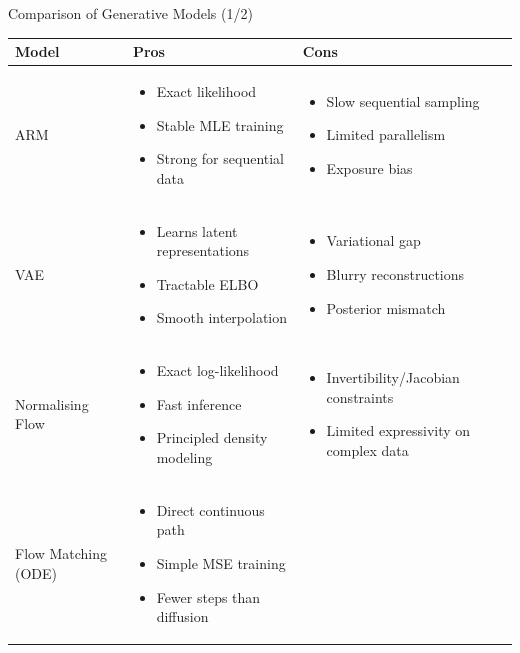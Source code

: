 \documentclass[xcolor=dvipsnames,aspectratio=169]{beamer}
\begin{document}
        \begin{frame}{Comparison of Generative Models (1/2)}
            \tiny
            \renewcommand{\arraystretch}{1.3}
            \begin{tabularx}{\linewidth}{@{} l X X @{}}
                \toprule
                \textbf{Model} & \textbf{Pros} & \textbf{Cons} \\ 
                \midrule
                ARM &
                \begin{itemize}\item Exact likelihood \item Stable MLE training \item Strong for sequential data \end{itemize} &
                \begin{itemize}\item Slow sequential sampling \item Limited parallelism \item Exposure bias \end{itemize} \\
                VAE &
                \begin{itemize}\item Learns latent representations \item Tractable ELBO \item Smooth interpolation \end{itemize} &
                \begin{itemize}\item Variational gap \item Blurry reconstructions \item Posterior mismatch \end{itemize} \\
                Normalising Flow &
                \begin{itemize}\item Exact log-likelihood \item Fast inference \item Principled density modeling \end{itemize} &
                \begin{itemize}\item Invertibility/Jacobian constraints \item Limited expressivity on complex data \end{itemize} \\
                Flow Matching (ODE) &
                \begin{itemize}\item Direct continuous path \item Simple MSE training \item Fewer steps than diffusion \end{itemize} &

\end{tabularx}
\end{frame}
\end{document}
